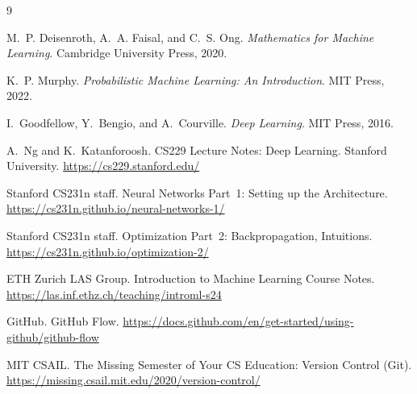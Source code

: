 \documentclass[11pt]{article}
\begin{document}
\begin{thebibliography}{9}

M.~P. Deisenroth, A.~A. Faisal, and C.~S. Ong.
\textit{Mathematics for Machine Learning}.
Cambridge University Press, 2020.

K.~P. Murphy.
\textit{Probabilistic Machine Learning: An Introduction}.
MIT Press, 2022.

I.~Goodfellow, Y.~Bengio, and A.~Courville.
\textit{Deep Learning}.
MIT Press, 2016.

A.~Ng and K.~Katanforoosh.
CS229 Lecture Notes: Deep Learning.
Stanford University.
\url{https://cs229.stanford.edu/}

Stanford CS231n staff.
Neural Networks Part~1: Setting up the Architecture.
\url{https://cs231n.github.io/neural-networks-1/}

Stanford CS231n staff.
Optimization Part~2: Backpropagation, Intuitions.
\url{https://cs231n.github.io/optimization-2/}

ETH Zurich LAS Group.
Introduction to Machine Learning Course Notes.
\url{https://las.inf.ethz.ch/teaching/introml-s24}

GitHub.
GitHub Flow.
\url{https://docs.github.com/en/get-started/using-github/github-flow}

MIT CSAIL.
The Missing Semester of Your CS Education: Version Control (Git).
\url{https://missing.csail.mit.edu/2020/version-control/}

\end{thebibliography}
\end{document}
